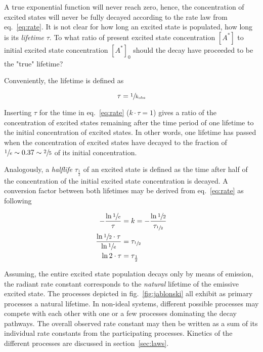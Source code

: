 		A true exponential function will never reach zero, hence, the concentration of excited states will never be fully decayed according to the rate law from eq.~\ref{eq:rate}. It is not clear for how long an excited state is populated, how long is its \emph{lifetime} $\tau$. To what ratio of present excited state concentration $[A^{\ast}]$ to initial excited state concentration $[A^{\ast}]_0$ should the decay have proceeded to be the "true" lifetime?

		Conveniently, the lifetime is defined as 

		\begin{equation}
		\label{eq:tau}
			\tau = \sfrac{1}{k_\mathrm{obs}}
		\end{equation}

		Inserting $\tau$ for the time in eq.~\ref{eq:rate} ($k\cdot\tau = 1$) gives a ratio of the concentration of excited states remaining after the time period of one lifetime to the initial concentration of excited states. In other words, one lifetime has passed when the concentration of excited states have decayed to the fraction of $\sfrac{1}{e} \sim 0.37 \sim \sfrac{2}{5}$ of its initial concentration. 

		Analogously, a \emph{halflife} $\tau_{\frac{1}{2}}$ of an excited state is defined as the time after half of the concentration of the initial excited state concentration is decayed. A conversion factor between both lifetimes may be derived from eq.~\ref{eq:rate} as following 

		\begin{equation}
			\begin{split}
				-\frac{\ln \sfrac{1}{e} }{\tau} &= k = -\frac{\ln\sfrac{1}{2}}{\tau_{\sfrac{1}{2}}} \\
				\frac{\ln\sfrac{1}{2} \cdot \tau}{\ln\sfrac{1}{e}} &= \tau_{\sfrac{1}{2}} \\
				\ln2\cdot\tau &= \tau_{\frac{1}{2}}
			\end{split}
		\end{equation}


		Assuming, the entire excited state population decays only by means of emission, the radiant rate constant corresponds to the \emph{natural} lifetime of the emissive excited state. The processes depicted in fig.~\ref{fig:jablonski} all exhibit as primary processes a natural lifetime. In non-ideal systems, different possible processes may compete with each other with one or a few processes dominating the decay pathways. The  overall observed rate constant may then be written as a sum of its individual rate constants from the participating processes. Kinetics of the different processes are discussed in section~\ref{sec:laws}. 

